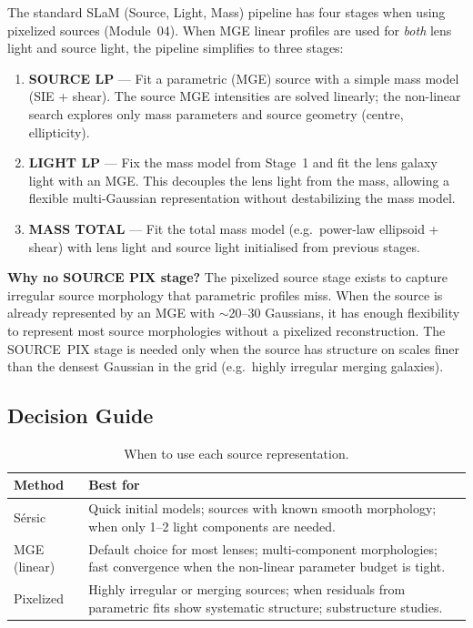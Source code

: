 \documentclass[11pt, letterpaper]{article}
\begin{document}
The standard SLaM (Source, Light, Mass) pipeline has four stages when
using pixelized sources (Module~04).  When MGE linear profiles are used
for \emph{both} lens light and source light, the pipeline simplifies to
three stages:

\begin{enumerate}[nosep]
  \item \textbf{SOURCE LP} --- Fit a parametric (MGE) source with a
    simple mass model (SIE + shear).  The source MGE intensities are
    solved linearly; the non-linear search explores only mass parameters
    and source geometry (centre, ellipticity).
  \item \textbf{LIGHT LP} --- Fix the mass model from Stage~1 and fit
    the lens galaxy light with an MGE.  This decouples the lens light
    from the mass, allowing a flexible multi-Gaussian representation
    without destabilizing the mass model.
  \item \textbf{MASS TOTAL} --- Fit the total mass model (e.g.\
    power-law ellipsoid + shear) with lens light and source light
    initialised from previous stages.
\end{enumerate}

\noindent \textbf{Why no SOURCE PIX stage?}  The pixelized source stage
exists to capture irregular source morphology that parametric profiles
miss.  When the source is already represented by an MGE with $\sim$20--30
Gaussians, it has enough flexibility to represent most source
morphologies without a pixelized reconstruction.  The SOURCE~PIX stage
is needed only when the source has structure on scales finer than the
densest Gaussian in the grid (e.g.\ highly irregular merging galaxies).

\subsection{Decision Guide}

\begin{table}[h]
\centering
\caption{When to use each source representation.}
\label{tab:decision}
\begin{tabular}{lp{8cm}}
\toprule
\textbf{Method} & \textbf{Best for} \\
\midrule
S\'ersic & Quick initial models; sources with known smooth morphology;
  when only 1--2 light components are needed. \\
\addlinespace
MGE (linear) & Default choice for most lenses; multi-component
  morphologies; fast convergence when the non-linear parameter
  budget is tight. \\
\addlinespace
Pixelized & Highly irregular or merging sources; when residuals from
  parametric fits show systematic structure; substructure studies. \\
\bottomrule
\end{tabular}
\end{table}
\end{document}
